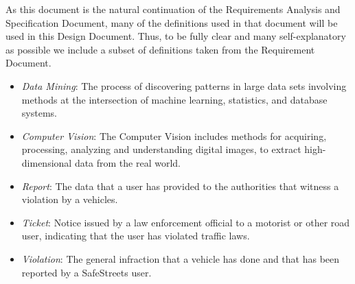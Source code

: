 As this document is the natural continuation of the Requirements Analysis and Specification Document, many of the definitions used in that document will be used in this Design Document.
Thus, to be fully clear and many self-explanatory as possible we include a subset of definitions taken from the Requirement Document.

\begin{itemize}
	\item \textit{Data Mining}: The process of discovering patterns in large data sets involving methods at the intersection of machine learning, statistics, and database systems.
	
	\item \textit{Computer Vision}: The Computer Vision includes methods for acquiring, processing, analyzing and understanding digital images, to extract high-dimensional data from the real world.
	
	
	\item \textit{Report}: The data that a user has provided to the authorities that witness a violation by a vehicles.
	
	\item \textit{Ticket}: Notice issued by a law enforcement official to a motorist or other road user, indicating that the user has violated traffic laws.
	
	\item \textit{Violation}: The general infraction that a vehicle has done and that has been reported by a SafeStreets user.
	
\end{itemize}
